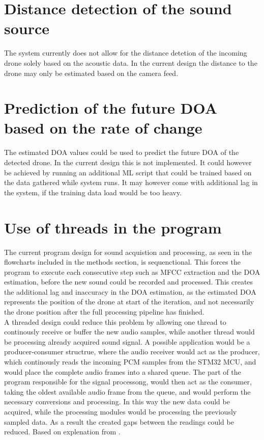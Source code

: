 \section{Distance detection of the sound source}
The system currently does not allow for the distance detetion of the incoming drone solely based on the acoustic data. In the current design the distance to the drone may only be estimated based on the camera feed.

\section{Prediction of the future DOA based on the rate of change}
The estimated DOA values could be used to predict the future DOA of the detected drone. In the current design this is not implemented. It could however be achieved by running an additional ML script that could be trained based on the data gathered while system runs. It may however come with additional lag in the system, if the training data load would be too heavy. 


\section{Use of threads in the program}
The current program design for sound acquistion and processing, as seen in the flowcharts included in the methods section, is sequenctional. This forces the program to execute each consecutive step such as MFCC extraction and the DOA estimation, before the new sound could be recorded and processed. This creates the additional lag and inaccuracy in the DOA estimation, as the estimated DOA represents the position of the drone at start of the iteration, and not necessarily the drone position after the full processing pipeline has finished.\\

A threaded design could reduce this problem by allowing one thread to continously receive or buffer the new audio samples, while another thread would be processing already acquired sound signal. A possible application would be a producer-consumer structrue, where the audio receiver would act as the producer, which continously reads the incoming PCM samples from the STM32 MCU, and would place the complete audio frames into a shared queue. The part of the program responsible for the signal processong, would then act as the consumer, taking the oldest available audio frame from the queue, and would perform the necessary conversions and processing. In this way the new data could be acquired, while the processing modules would be processing the previously sampled data. As a result the created gaps between the readings could be reduced. Based on explenation from \cite{anderson_producer_consumer_python}. 


